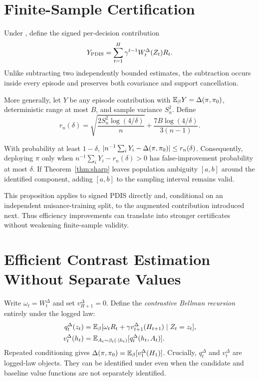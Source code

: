 \section{Finite-Sample Certification}

Under \UCC, define the signed per-decision contribution
\begin{equation}
Y_{\rm PDIS}=\sum_{t=1}^H\gamma^{t-1}
W_t^\Delta(Z_t)R_t.
\end{equation}
Unlike subtracting two independently bounded estimates, the subtraction occurs inside every episode and preserves both covariance and support cancellation.

More generally, let $Y$ be any episode contribution with $\mathbb{E}_\beta Y=\Delta(\pi,\pi_0)$, deterministic range at most $B$, and sample variance $S_n^2$. Define
\begin{equation}
r_n(\delta)=
\sqrt{\frac{2S_n^2\log(4/\delta)}{n}}
+\frac{7B\log(4/\delta)}{3(n-1)}.
\label{eq:bernstein}
\end{equation}

\begin{proposition}
\label{prop:certificate}
With probability at least $1-\delta$,
$|n^{-1}\sum_iY_i-\Delta(\pi,\pi_0)|\le r_n(\delta)$.
Consequently, deploying $\pi$ only when
$n^{-1}\sum_iY_i-r_n(\delta)>0$ has false-improvement probability at most $\delta$. If Theorem~\ref{thm:sharp} leaves population ambiguity $[a,b]$ around the identified component, adding $[a,b]$ to the sampling interval remains valid.
\end{proposition}

This proposition applies to signed PDIS directly and, conditional on an independent nuisance-training split, to the augmented contribution introduced next. Thus efficiency improvements can translate into stronger certificates without weakening finite-sample validity.

\section{Efficient Contrast Estimation Without Separate Values}

Write $\omega_t=W_t^\Delta$ and set $v_{H+1}^\Delta=0$. Define the \emph{contrastive Bellman recursion} entirely under the logged law:
\begin{align}
q_t^\Delta(z_t)
&=\mathbb{E}_\beta[\omega_tR_t+\gamma v_{t+1}^\Delta(H_{t+1})\mid Z_t=z_t],
\label{eq:contrastq}\\
v_t^\Delta(h_t)
&=\mathbb{E}_{A_t\sim\beta_t(\cdot\mid h_t)}[q_t^\Delta(h_t,A_t)].
\label{eq:contrastv}
\end{align}
Repeated conditioning gives $\Delta(\pi,\pi_0)=\mathbb{E}_\beta[v_1^\Delta(H_1)]$. Crucially, $q_t^\Delta$ and $v_t^\Delta$ are logged-law objects. They can be identified under \UCC even when the candidate and baseline value functions are not separately identified.

